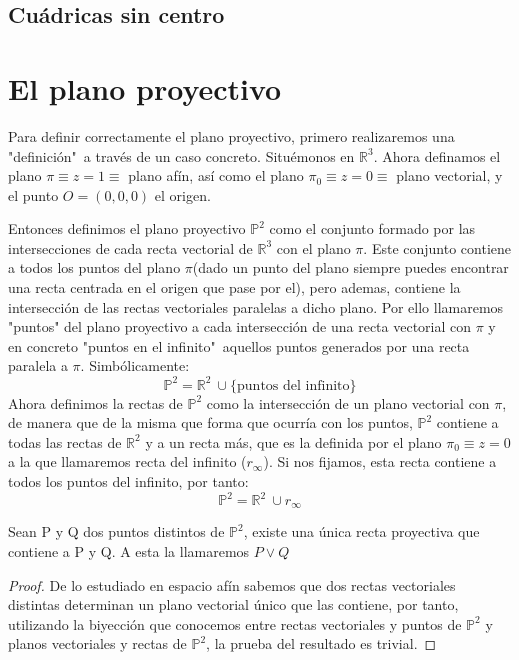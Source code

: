 \subsection{Cuádricas sin centro}

\newpage

\section{El plano proyectivo}

Para definir correctamente el plano proyectivo, primero realizaremos una "definición"\ a través de un caso concreto. Situémonos en $\mathbb{R}^3$. Ahora definamos el plano $\pi \equiv z = 1 \equiv$ plano afín, así como el plano $\pi_0 \equiv z = 0 \equiv$ plano vectorial, y el punto $O = (0,0,0)$ el origen.


Entonces definimos el plano proyectivo $\mathbb{P}^2$ como el conjunto formado por las intersecciones de cada recta vectorial de $\mathbb{R}^3$ con el plano $\pi$. Este conjunto contiene a todos los puntos del plano $\pi$(dado un punto del plano siempre puedes encontrar una recta centrada en el origen que pase por el), pero ademas, contiene la intersección de las rectas vectoriales paralelas a dicho plano. Por ello llamaremos "puntos" del plano proyectivo a cada intersección de una recta vectorial con $\pi$ y en concreto "puntos en el infinito"\ aquellos puntos generados por una recta paralela a $\pi$. Simbólicamente:
$$\mathbb{P}^2 = \mathbb{R}^2\ \cup \{\text{puntos del infinito}\}$$
Ahora definimos la rectas de $\mathbb{P}^2$ como la intersección de un plano vectorial con $\pi$, de manera que de la misma que forma que ocurría con los puntos, $\mathbb{P}^2$ contiene a todas las rectas de $\mathbb{R}^2$ y a un recta más, que es la definida por el plano $\pi_0 \equiv z= 0$ a la que llamaremos recta del infinito ($r_\infty$). Si nos fijamos, esta recta contiene a todos los puntos del infinito, por tanto:
$$\mathbb{P}^2 = \mathbb{R}^2\ \cup r_\infty$$

\begin{nth}
Sean P y Q dos puntos distintos de $\mathbb{P}^2$, existe una única recta proyectiva que contiene a P y Q. A esta la llamaremos $P \vee Q$
\end{nth}
\begin{proof}

De lo estudiado en espacio afín sabemos que dos rectas vectoriales distintas determinan un plano vectorial único que las contiene, por tanto, utilizando la biyección que conocemos entre rectas vectoriales y puntos de $\mathbb{P}^2$ y planos vectoriales y rectas de $\mathbb{P}^2$, la prueba del resultado es trivial.
\end{proof}

